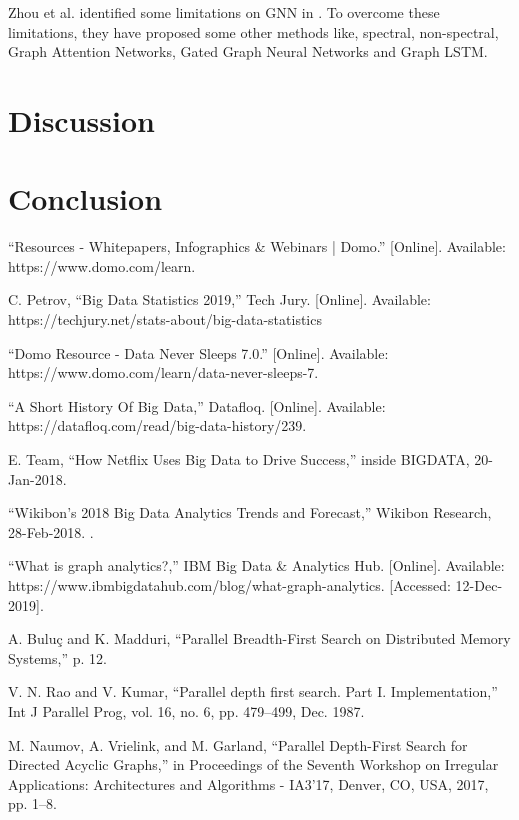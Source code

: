 \documentclass[journal,twoside,web]{ieeecolor}
\begin{document}
Zhou et al. identified some limitations on GNN in \cite{60}. To overcome these limitations, they have proposed some other methods like, spectral, non-spectral, Graph Attention Networks, Gated Graph Neural Networks and Graph LSTM. 

\section{Discussion}
\label{sec:discussion}

\section{Conclusion}
\label{sec:conclusion}

\begin{thebibliography}{9}
    “Resources - Whitepapers, Infographics \& Webinars | Domo.” [Online]. Available: https://www.domo.com/learn.
    
    C. Petrov, “Big Data Statistics 2019,” Tech Jury. [Online]. Available: https://techjury.net/stats-about/big-data-statistics
    
    “Domo Resource - Data Never Sleeps 7.0.” [Online]. Available: https://www.domo.com/learn/data-never-sleeps-7.
    
    “A Short History Of Big Data,” Datafloq. [Online]. Available: https://datafloq.com/read/big-data-history/239.
    
    E. Team, “How Netflix Uses Big Data to Drive Success,” inside BIGDATA, 20-Jan-2018.
    
    “Wikibon’s 2018 Big Data Analytics Trends and Forecast,” Wikibon Research, 28-Feb-2018. .
    
    “What is graph analytics?,” IBM Big Data \& Analytics Hub. [Online]. Available: https://www.ibmbigdatahub.com/blog/what-graph-analytics. [Accessed: 12-Dec-2019].
    
    A. Buluç and K. Madduri, “Parallel Breadth-First Search on Distributed Memory Systems,” p. 12.
    
    V. N. Rao and V. Kumar, “Parallel depth first search. Part I. Implementation,” Int J Parallel Prog, vol. 16, no. 6, pp. 479–499, Dec. 1987.
    
    M. Naumov, A. Vrielink, and M. Garland, “Parallel Depth-First Search for Directed Acyclic Graphs,” in Proceedings of the Seventh Workshop on Irregular Applications: Architectures and Algorithms - IA3’17, Denver, CO, USA, 2017, pp. 1–8.
    

\end{thebibliography}
\end{document}
